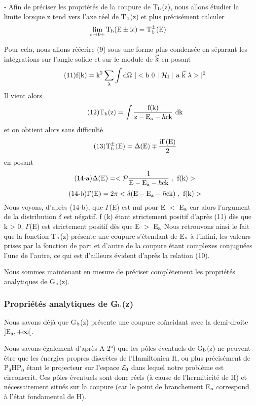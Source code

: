 - Afin de préciser les propriétés de la coupure de T$_{\text{b}}$(z),
nous allons étudier la limite lorsque z tend vers l'axe réel de T$_{\text{b}}$(z) et plus précisément calculer
\[
\lim_{\epsilon\to 0+}\text{T}_{\text{b}}(\text{E}\pm\text{i}\epsilon)=\text{T}_{\text{b}}^\pm(\text{E})
\]

Pour cela, nous allons réécrire (9) sous une forme plus condensée
en séparant les intégrations sur l'angle solide et sur le module de $\vec{\text{k}}$ en posant
\[
\tag{11}\mt{f(k)}=\mt{k}^2\sum_\lambda\int\mt{d}\Omega\ |<\mt{b 0 }|\ \mc{H}_\mt{I}\ |\mt{ a }\vec{\mt{k}}\ \lambda> |^2
\]
Il vient alors
\[
\tag{12}\text{T}_{\text{b}}(\text{z})=\int\frac{\text{f(k)}}
{\text{z}-\text{E}_{\text{a}}-\hbar\text{ck}}\ \text{dk}
\]
et on obtient alors sans difficulté
\[
\tag{13}\text{T}_{\text{b}}^\pm(\text{E})=\Delta(\text{E})\mp\frac{\text{i}\Gamma(\text{E})}{2}
\]
en posant
\[
\tag{14-a}\Delta(\text{E})=<\mathcal{P}\frac{1}
{\text{E}-\text{E}_{\text{a}}-\hbar\text{ck}}\ ,\text{ f(k)}>
\]
\[
\tag{14-b}\Gamma(\text{E})=2\pi<\delta
(\text{E}-\text{E}_{\text{a}}-\hbar\text{ck})\ ,\text{ f(k)}>
\]
Nous voyons, d'après (14-b), que $\Gamma$(E) est nul pour E $<$ E$_{\text{a}}$ car
alors l'argument de la distribution $\delta$ est négatif. f (k) étant strictement
positif d'après (11) dès que k > 0, $\Gamma$(E) est strictement positif dès que
E $>$ E$_{\text{a}}$ Nous retrouvons ainsi le fait que la fonction T$_{\text{b}}$(z) présente une
coupure s'étendant de E$_{\text{a}}$ à l'infini, les valeurs prises par la fonction de
part et d'autre de la coupure étant complexes conjuguées l'une de l'autre,
ce qui est d'ailleurs évident d'après la relation (10).

Nous sommes maintenant en mesure de préciser complètement les
propriétés analytiques de G$_{\text{b}}$(z).

\subsubsection{Propriétés analytiques de G$_{\text{b}}$(z)}%
Nous savons déjà que G$_{\text{b}}$(z) présente une coupure coïncidant
avec la demi-droite $]\text{E}_{\text{a}},+\infty[$.

Nous savons également d'après A 2°) que les pôles éventuels de
G$_{\text{b}}$(z) ne peuvent être que les énergies propres discrètes de l'Hamiltonien H,
ou plus précisément de P$_0$HP$_0$ étant le projecteur sur l'espace $\mathcal{E}_0$
dans lequel notre problème est circonscrit. Ces pôles éventuels sont donc réels
(à cause de l'hermiticité de H) et nécessairement situés sur la coupure (car
le point de branchement E$_{\text{a}}$ correspond à l'état fondamental de H).

